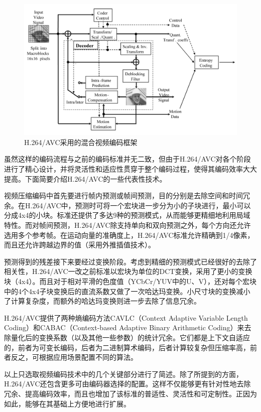 \begin{figure}[h]
	\centering
	\includegraphics[width = 1.0\linewidth]{clip/03.png}
	\caption{H.264/AVC采用的混合视频编码框架\label{fig:03}}
\end{figure}

虽然这样的编码流程与之前的编码标准并无二致，但由于H.264/AVC对各个阶段进行了精心设计，并将灵活性和适应性贯穿于整个编码过程，使得其编码效率大大提高。下面简要介绍H.264/AVC的一些代表性技术。

视频压缩编码中首先要进行帧内预测或帧间预测，目的分别是去除空间和时间冗余。在H.264/AVC中，预测时可将一个宏块进一步分为小的子块进行，最小可以分成4x4的小块。标准还提供了多达9种的预测模式，从而能够更精细地利用局域特性。而对帧间预测，H.264/AVC除支持单向和双向预测之外，每个方向还允许选用多个参考帧。在运动向量的准确度上，H.264/AVC标准允许精确到1/4像素，而且还允许跨越边界的值（采用外推插值技术）。

预测得到的残差接下来要经过变换阶段。考虑到精细的预测模式已经很好的去除了相关性，H.264/AVC一改之前标准以宏块为单位的DCT变换，采用了更小的变换块（4x4）。而且对于相对平滑的色度值（YCbCr/YUV中的U、V），还对每个宏块中的4个4x4子块变换后的直流系数又做了一次哈达玛变换。小尺寸块的变换减小了计算复杂度，而额外的哈达玛变换则进一步去除了信息冗余。

H.264/AVC提供了两种熵编码方法CAVLC（Context Adaptive Variable Length Coding）和CABAC（Context-based Adaptive Binary Arithmetic Coding）来去除量化后的变换系数（以及其他一些参数）的统计冗余。它们都是上下文自适应的，前者为可变长编码，后者为二进制算术编码，后者计算较复杂但压缩率高，前者反之，可根据应用场景配置不同的算法。

以上只选取视频编码技术中的几个关键部分进行了简述。除了所提到的方面，
H.264/AVC还包含更多可由编码器选择的配置。这样不仅能够更有针对性地去除冗余、提高编码效率，而且也增加了该标准的普适性、灵活性和可定制性。正因为如此，能够在其基础上方便地进行扩展。

